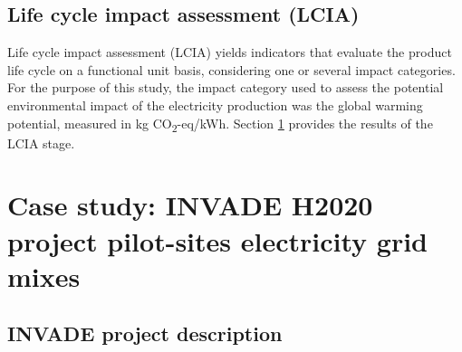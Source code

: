 {{%

\subsection{Life cycle impact assessment (LCIA)}\label{LCIA}
{Life cycle impact assessment (LCIA) yields indicators  that evaluate the product life cycle on a functional unit basis, considering one or several impact categories. For the purpose of this study, the impact category used to assess the potential environmental impact of the electricity production was the global warming potential, measured in kg CO\textsubscript2-eq/kWh}. Section \ref{CaseStudy} provides the results of the LCIA stage.}

\section{Case study: INVADE H2020 project pilot-sites electricity grid mixes} \label{CaseStudy}
\subsection{INVADE project description}

}
